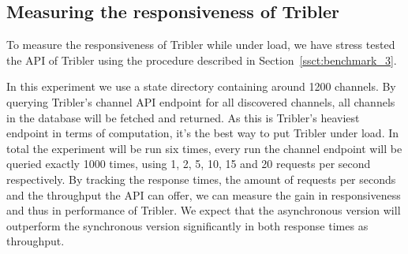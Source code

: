 \subsection{Measuring the responsiveness of Tribler}

To measure the responsiveness of Tribler while under load, we have stress tested the API of Tribler using the procedure described in Section~\ref{ssct:benchmark_3}.

In this experiment we use a state directory containing around 1200 channels.
By querying Tribler's channel API endpoint for all discovered channels, all channels in the database will be fetched and returned.
As this is Tribler's heaviest endpoint in terms of computation, it's the best way to put Tribler under load.
In total the experiment will be run six times, every run the channel endpoint will be queried exactly 1000 times, using 1, 2, 5, 10, 15 and 20 requests per second respectively.
By tracking the response times, the amount of requests per seconds and the throughput the API can offer, we can measure the gain in responsiveness and thus in performance of Tribler.
We expect that the asynchronous version will outperform the synchronous version significantly in both response times as throughput.

